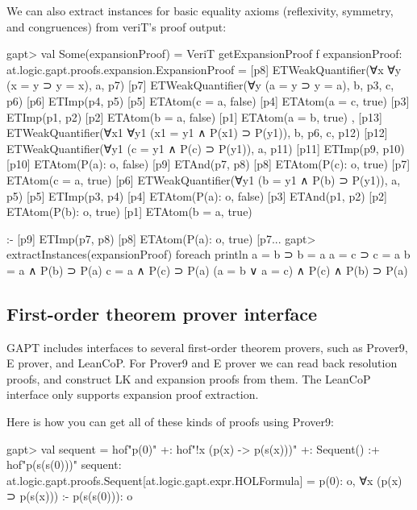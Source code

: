 \documentclass[a4paper,11pt]{article}
\begin{document}
We can also extract instances for basic equality axioms (reflexivity, symmetry,
and congruences) from veriT's proof output:
\begin{clilisting}
gapt> val Some(expansionProof) = VeriT getExpansionProof f
expansionProof: at.logic.gapt.proofs.expansion.ExpansionProof =
[p8] ETWeakQuantifier(∀x ∀y (x = y ⊃ y = x), a, p7)
[p7] ETWeakQuantifier(∀y (a = y ⊃ y = a), b, p3, c, p6)
[p6] ETImp(p4, p5)
[p5] ETAtom(c = a, false)
[p4] ETAtom(a = c, true)
[p3] ETImp(p1, p2)
[p2] ETAtom(b = a, false)
[p1] ETAtom(a = b, true)
,
[p13] ETWeakQuantifier(∀x1 ∀y1 (x1 = y1 ∧ P(x1) ⊃ P(y1)), b, p6, c, p12)
[p12] ETWeakQuantifier(∀y1 (c = y1 ∧ P(c) ⊃ P(y1)), a, p11)
[p11] ETImp(p9, p10)
[p10] ETAtom(P(a): o, false)
[p9] ETAnd(p7, p8)
[p8] ETAtom(P(c): o, true)
[p7] ETAtom(c = a, true)
[p6] ETWeakQuantifier(∀y1 (b = y1 ∧ P(b) ⊃ P(y1)), a, p5)
[p5] ETImp(p3, p4)
[p4] ETAtom(P(a): o, false)
[p3] ETAnd(p1, p2)
[p2] ETAtom(P(b): o, true)
[p1] ETAtom(b = a, true)

:-
[p9] ETImp(p7, p8)
[p8] ETAtom(P(a): o, true)
[p7...
gapt> extractInstances(expansionProof) foreach println
a = b ⊃ b = a
a = c ⊃ c = a
b = a ∧ P(b) ⊃ P(a)
c = a ∧ P(c) ⊃ P(a)
(a = b ∨ a = c) ∧ P(c) ∧ P(b) ⊃ P(a)

\end{clilisting}

\subsection{First-order theorem prover interface}

GAPT includes interfaces to several first-order theorem provers, such as
Prover9, E prover, and LeanCoP.  For Prover9 and E prover we can read back
resolution proofs, and construct LK and expansion proofs from them.  The
LeanCoP interface only supports expansion proof extraction.

Here is how you can get all of these kinds of proofs using Prover9:
\begin{clilisting}
gapt> val sequent = hof"p(0)" +: hof"!x (p(x) -> p(s(x)))" +: Sequent() :+ hof"p(s(s(0)))"
sequent: at.logic.gapt.proofs.Sequent[at.logic.gapt.expr.HOLFormula] = p(0): o, ∀x (p(x) ⊃ p(s(x))) :- p(s(s(0))): o

\end{clilisting}
\end{document}
